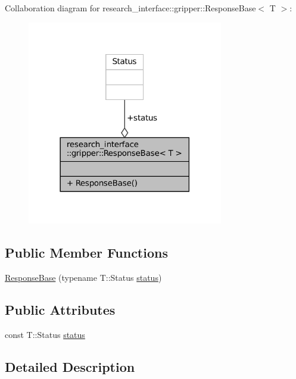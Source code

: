 Collaboration diagram for research\+\_\+interface\+:\+:gripper\+:\+:Response\+Base$<$ T $>$\+:
\nopagebreak
\begin{figure}[H]
\begin{center}
\leavevmode
\includegraphics[width=242pt]{structresearch__interface_1_1gripper_1_1ResponseBase__coll__graph}
\end{center}
\end{figure}
\subsection*{Public Member Functions}
\begin{DoxyCompactItemize}
\item 
\hyperlink{structresearch__interface_1_1gripper_1_1ResponseBase_a22a7f3cb6744d19e3ce8fe36536cdfc4}{Response\+Base} (typename T\+::\+Status \hyperlink{structresearch__interface_1_1gripper_1_1ResponseBase_a4d4d13a790eac0381966f39dbcdff84a}{status})
\end{DoxyCompactItemize}
\subsection*{Public Attributes}
\begin{DoxyCompactItemize}
\item 
const T\+::\+Status \hyperlink{structresearch__interface_1_1gripper_1_1ResponseBase_a4d4d13a790eac0381966f39dbcdff84a}{status}
\end{DoxyCompactItemize}


\subsection{Detailed Description}

